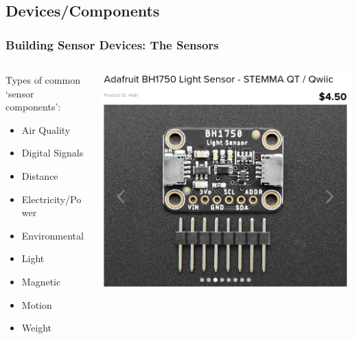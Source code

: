 \documentclass[aspectratio=169]{beamer}
\begin{document}
\subsection{Devices/Components}
\begin{frame}[fragile]
  \frametitle{Building Sensor Devices: The Sensors}
  \begin{columns}[]
    \begin{column}[T]{0.45\paperwidth}
      Types of common `sensor components':
      \begin{itemize}%
        \item{Air Quality}
        \item{Digital Signals}
        \item{Distance}
        \item{Electricity/Power}
        \item{Environmental}
        \item{Light}
        \item{Magnetic}
        \item{Motion}
        \item{Weight}
      \end{itemize}
    \end{column}
    \begin{column}[T]{0.45\paperwidth}
      \includegraphics[width=0.45\paperwidth,keepaspectratio]{images/bh1750-ada.png}
    \end{column}
  \end{columns}
\end{frame}
\end{document}
